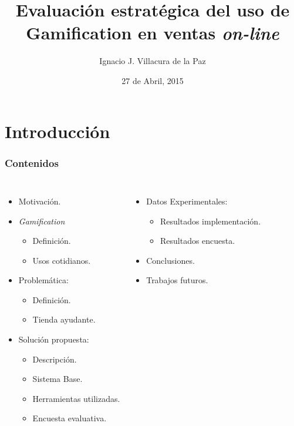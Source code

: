 \documentclass[10pt, compress]{beamer}
\title{Evaluación estratégica del uso de Gamification en ventas \emph{on-line}}
\subtitle{}
\date{27 de Abril, 2015}
\author{Ignacio J. Villacura de la Paz}
\institute{Departamento de Informática\\ Universidad Técnica Federico Santa María}
\begin{document}
\maketitle

\section{Introducción}
\begin{frame}[fragile]
    \frametitle{Contenidos}
    \begin{columns}[onlytextwidth]
            \begin{itemize}
                \item Motivación.
                \item \emph{Gamification}
                \begin{itemize}
                    \item Definición.
                    \item Usos cotidianos.
                \end{itemize}
                \item Problemática:
                \begin{itemize}
                    \item Definición.
                    \item Tienda ayudante.
                \end{itemize}
                \item Solución propuesta:
                \begin{itemize}
                    \item Descripción.
                    \item Sistema Base.
                    \item Herramientas utilizadas.
                    \item Encuesta evaluativa.
                \end{itemize}
            \end{itemize}
            \begin{itemize}
                \item Datos Experimentales:
                \begin{itemize}
                    \item Resultados implementación.
                    \item Resultados encuesta.
                \end{itemize}
                \item Conclusiones.
                \item Trabajos futuros.
            \end{itemize}
        \end{columns}
\end{frame}
\end{document}
